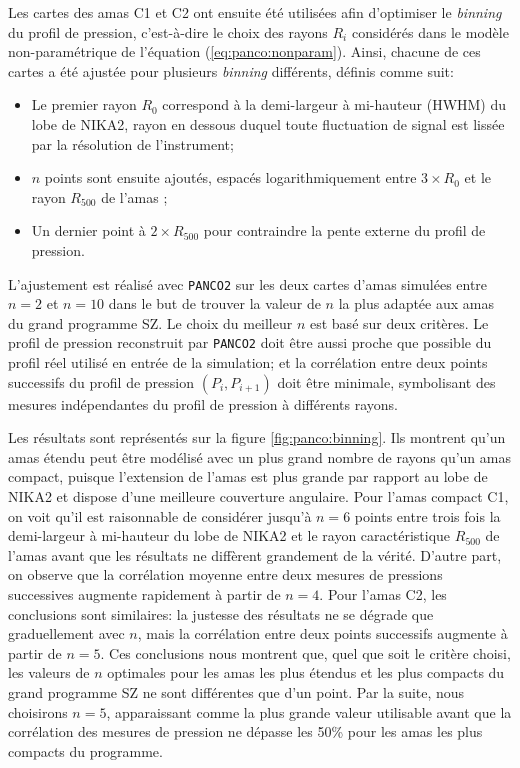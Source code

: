 Les cartes des amas C1 et C2 ont ensuite été utilisées afin d'optimiser le \textit{binning} du profil de pression, c'est-à-dire le choix des rayons $R_i$ considérés dans le modèle non-paramétrique de l'équation (\ref{eq:panco:nonparam}).
Ainsi, chacune de ces cartes a été ajustée pour plusieurs \textit{binning} différents, définis comme suit:
\begin{itemize}[leftmargin=*]
    \setlength\itemsep{0pt}
    \item Le premier rayon $R_0$ correspond à la demi-largeur à mi-hauteur (HWHM) du lobe de NIKA2, rayon en dessous duquel toute fluctuation de signal est lissée par la résolution de l'instrument;
    \item $n$ points sont ensuite ajoutés, espacés logarithmiquement entre $3 \times R_0$ et le rayon $R_{500}$ de l'amas ;
    \item Un dernier point à $2 \times R_{500}$ pour contraindre la pente externe du profil de pression.
\end{itemize}
L'ajustement est réalisé avec \texttt{PANCO2} sur les deux cartes d'amas simulées entre $n=2$ et $n=10$ dans le but de trouver la valeur de $n$ la plus adaptée aux amas du grand programme SZ.
Le choix du meilleur $n$ est basé sur deux critères.
Le profil de pression reconstruit par \texttt{PANCO2} doit être aussi proche que possible du profil réel utilisé en entrée de la simulation; et la corrélation entre deux points successifs du profil de pression $(P_i, P_{i+1})$ doit être minimale, symbolisant des mesures indépendantes du profil de pression à différents rayons.

Les résultats sont représentés sur la figure \ref{fig:panco:binning}.
Ils montrent qu'un amas étendu peut être modélisé avec un plus grand nombre de rayons qu'un amas compact, puisque l'extension de l'amas est plus grande par rapport au lobe de NIKA2 et dispose d'une meilleure couverture angulaire.
Pour l'amas compact C1, on voit qu'il est raisonnable de considérer jusqu'à $n=6$ points entre trois fois la demi-largeur à mi-hauteur du lobe de NIKA2 et le rayon caractéristique $R_{500}$ de l'amas avant que les résultats ne diffèrent grandement de la vérité.
D'autre part, on observe que la corrélation moyenne entre deux mesures de pressions successives augmente rapidement à partir de $n=4$.
Pour l'amas C2, les conclusions sont similaires: la justesse des résultats ne se dégrade que graduellement avec $n$, mais la corrélation entre deux points successifs augmente à partir de $n=5$.
Ces conclusions nous montrent que, quel que soit le critère choisi, les valeurs de $n$ optimales pour les amas les plus étendus et les plus compacts du grand programme SZ ne sont différentes que d'un point.
Par la suite, nous choisirons $n=5$, apparaissant comme la plus grande valeur utilisable avant que la corrélation des mesures de pression ne dépasse les 50\% pour les amas les plus compacts du programme.

